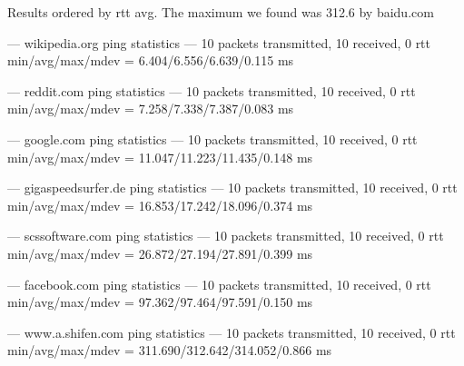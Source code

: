 Results ordered by rtt avg. The maximum we found was 312.6 by baidu.com

--- wikipedia.org ping statistics ---
10 packets transmitted, 10 received, 0%
rtt min/avg/max/mdev = 6.404/6.556/6.639/0.115 ms

--- reddit.com ping statistics ---
10 packets transmitted, 10 received, 0%
rtt min/avg/max/mdev = 7.258/7.338/7.387/0.083 ms

--- google.com ping statistics ---
10 packets transmitted, 10 received, 0%
rtt min/avg/max/mdev = 11.047/11.223/11.435/0.148 ms

--- gigaspeedsurfer.de ping statistics ---
10 packets transmitted, 10 received, 0%
rtt min/avg/max/mdev = 16.853/17.242/18.096/0.374 ms

--- scssoftware.com ping statistics ---
10 packets transmitted, 10 received, 0%
rtt min/avg/max/mdev = 26.872/27.194/27.891/0.399 ms

--- facebook.com ping statistics ---
10 packets transmitted, 10 received, 0%
rtt min/avg/max/mdev = 97.362/97.464/97.591/0.150 ms

--- www.a.shifen.com ping statistics ---
10 packets transmitted, 10 received, 0%
rtt min/avg/max/mdev = 311.690/312.642/314.052/0.866 ms
